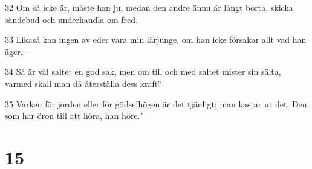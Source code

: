 \par 32 Om så icke är, måste han ju, medan den andre ännu är långt borta, skicka sändebud och underhandla om fred.
\par 33 Likaså kan ingen av eder vara min lärjunge, om han icke försakar allt vad han äger. -
\par 34 Så är väl saltet en god sak, men om till och med saltet mister sin sälta, varmed skall man då återställa dess kraft?
\par 35 Varken för jorden eller för gödselhögen är det tjänligt; man kastar ut det. Den som har öron till att höra, han höre."

\chapter{15}

